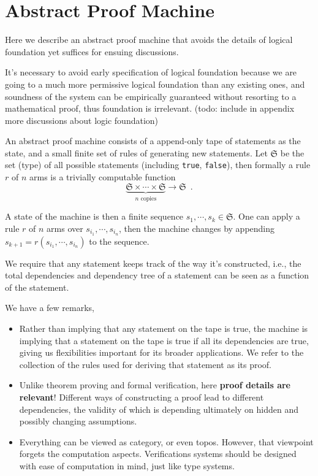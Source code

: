 \documentclass[11pt, oneside]{article}   	%
\theoremstyle{definition}
\def\code#1{\texttt{#1}}
\begin{document}
\section{Abstract Proof Machine}

Here we describe an abstract proof machine that avoids the details of logical foundation yet suffices for ensuing discussions.

It's necessary to avoid early specification of logical foundation because we are going to a much more permissive logical foundation than any existing ones, and soundness of the system can be empirically guaranteed without resorting to a mathematical proof, thus foundation is irrelevant. (todo: include in appendix more discussions about logic foundation)

An abstract proof machine consists of a append-only tape of statements as the state, and a small finite set of rules of generating new statements. Let $\mathfrak{S}$ be the set (type) of all possible statements (including \code{true}, \code{false}), then formally a rule $r$ of $n$ arms is a trivially computable function
\begin{equation}
\underbrace{\mathfrak{S}\times\cdots\times \mathfrak{S}}_{n\text{ copies}}\to \mathfrak{S}\enspace.
\end{equation}

A state of the machine is then a finite sequence $s_1,\cdots, s_k\in \mathfrak{S}$. One can apply a rule $r$ of $n$ arms over $s_{i_1},\cdots, s_{i_n}$, then the machine changes by appending $s_{k+1} = r(s_{i_1},\cdots, s_{i_n})$ to the sequence.

We require that any statement keeps track of the way it's constructed, i.e., the total dependencies and dependency tree of a statement can be seen as a function of the statement.


\begin{rmk} We have a few remarks,
	
	\begin{itemize}
		\item Rather than implying that any statement on the tape is true, the machine is implying that a statement on the tape is true if all its dependencies are true, giving us flexibilities important for its broader applications. We refer to the collection of the rules used for deriving that statement as its proof.
		\item Unlike theorem proving and formal verification, here \textbf{proof details are relevant}! Different ways of constructing a proof lead to different dependencies, the validity of which is depending ultimately on hidden and possibly changing assumptions.
		\item Everything can be viewed as category, or even topos. However, that viewpoint forgets the computation aspects. Verifications systems should be designed with ease of computation in mind, just like type systems.
	\end{itemize}
\end{rmk}
\end{document}
